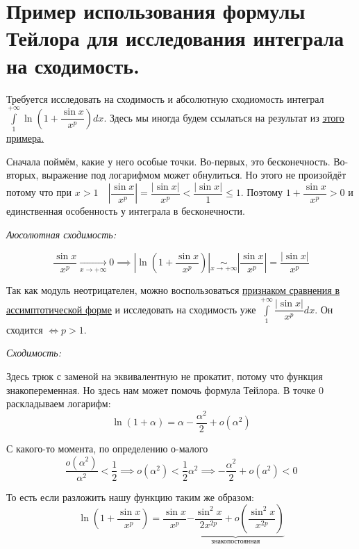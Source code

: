 \documentclass[../main.tex]{subfiles}
\begin{document}
\newpage
\section{Пример использования формулы Тейлора для исследования интеграла на сходимость.}

Требуется исследовать на сходимость и абсолютную сходиомость интеграл \( \displaystyle\int\limits_{ 1}^{ + \infty } \ln \left( 1+ \dfrac{ \sin x}{ x^p} \right)dx\). Здесь мы иногда будем ссылаться на результат из \hyperlink{ex:converge_sin}{этого примера.}

Сначала поймём, какие у него особые точки. Во-первых, это бесконечность. Во-вторых, выражение под логарифмом может обнулиться. Но этого не произойдёт потому что при \( x > 1\quad \left| \dfrac{ \sin x}{ x^p} \right|= \dfrac{ \left|\sin x\right|}{ x^p } < \dfrac{ \left|\sin x\right|}{ 1} \leq 1  \). Поэтому \( 1+ \dfrac{ \sin x}{ x^p} >0\) и единственная особенность у интеграла в бесконечности. 

\emph{Аюсолютная сходимость:}

\[ \dfrac{ \sin x}{ x^p} \underset{x \rightarrow + \infty }{\longrightarrow} 0 \implies \left| \ln \left( 1+ \dfrac{ \sin x}{ x^p} \right)\right|\underset{x \rightarrow + \infty }{\sim} \left| \dfrac{ \sin x}{ x^p} \right|= \dfrac{ \left|\sin x\right|}{ x^p} \]

Так как модуль неотрицателен, можно воспользоваться \hyperlink{thm:converge_sim}{признаком сравнения в ассимптотической форме} и исследовать на сходимость уже \( \displaystyle\int\limits_{ 1}^{ + \infty} \dfrac{ \left|\sin x\right|}{ x^p}dx \). Он сходится \( \Longleftrightarrow p>1\).

\emph{Сходимость:}

Здесь трюк с заменой на эквивалентную не прокатит, потому что функция знакопеременная. Но здесь нам может помочь формула Тейлора. В точке \( 0\) раскладываем логарифм:
\[ \ln \left( 1+ \alpha \right)= \alpha - \dfrac{ \alpha^2}{ 2} +o\left( \alpha^2 \right) \]

С какого-то момента, по определению о-малого 
\[ \dfrac{ o\left(\alpha^2\right)}{ \alpha ^2} < \dfrac{ 1}{ 2} \implies o\left( \alpha ^2\right) < \dfrac{ 1}{ 2} \alpha ^2 \implies - \dfrac{ \alpha^2}{ 2} +o\left( a^2\right) <0\]

То есть если разложить нашу функцию таким же образом:
\[ \ln \left( 1+ \dfrac{ \sin x}{ x^p} \right)=\dfrac{ \sin x}{ x^p} \underbrace{- \dfrac{ \sin^2 x}{ 2x^{2p}} + o\left( \dfrac{ \sin^2 x}{ x^{2p}}\right)}_{\text{знакопостоянная}}\]
\end{document}
